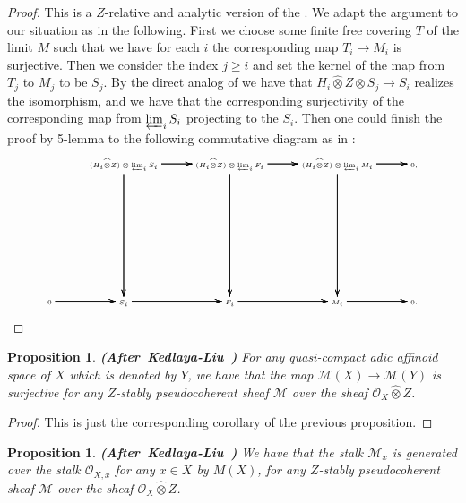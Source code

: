 \documentclass[12pt]{amsart}
\newtheorem{proposition}[theorem]{Proposition}
\theoremstyle{definition}
\numberwithin{equation}{section}
\begin{document}
\begin{proof}
This is a $Z$-relative and analytic version of the \cite[Lemma 2.6.4]{KL2}. We adapt the argument to our situation as in the following. First we choose some finite free covering $T$ of the limit $M$ such that we have for each $i$ the corresponding map $T_i\rightarrow M_i$ is surjective. Then we consider the index $j\geq i$ and set the kernel of the map from $T_j$ to $M_j$ to be $S_j$. By the direct analog of \cite[Lemma 2.5.6]{KL2} we have that $H_i\widehat{\otimes}Z\otimes S_j\overset{}{\rightarrow}S_i$ realizes the isomorphism, and we have that the corresponding surjectivity of the corresponding map from $\varprojlim_i S_i$ projecting to the $S_i$. Then one could finish the proof by 5-lemma to the following commutative diagram as in \cite[Lemma 2.6.4]{KL2}:
\[ \tiny
\xymatrix@C+0pc@R+6pc{
 &(H_i\widehat{\otimes}Z)\otimes \varprojlim_i S_i \ar[r]\ar[r]\ar[r] \ar[d]\ar[d]\ar[d] &(H_i\widehat{\otimes}Z)\otimes \varprojlim_i F_i \ar[r]\ar[r]\ar[r] \ar[d]\ar[d]\ar[d] &(H_i\widehat{\otimes}Z)\otimes \varprojlim_i M_i\ar[r]\ar[r]\ar[r]  \ar[d]\ar[d]\ar[d]&0,\\
0 \ar[r]\ar[r]\ar[r] &S_i   \ar[r]\ar[r]\ar[r] &F_i \ar[r]\ar[r]\ar[r] &M_i \ar[r]\ar[r]\ar[r] &0.\\
}
\]
 
\end{proof}



\begin{proposition}  \mbox{\bf{(After Kedlaya-Liu \cite[Theorem 2.6.5]{KL2})}}
For any quasi-compact adic affinoid space of $X$ which is denoted by $Y$, we have that the map $\mathcal{M}(X)\rightarrow \mathcal{M}(Y)$ is surjective for any $Z$-stably pseudocoherent sheaf $\mathcal{M}$ over the sheaf $\mathcal{O}_X\widehat{\otimes}Z$.	
\end{proposition}


\begin{proof}
This is just the corresponding corollary of the previous proposition.	
\end{proof}











\begin{proposition}  \mbox{\bf{(After Kedlaya-Liu \cite[Theorem 2.6.5]{KL2})}}
We have that the stalk $\mathcal{M}_x$ is generated over the stalk $\mathcal{O}_{X,x}$ for any $x\in X$ by $M(X)$, for any $Z$-stably pseudocoherent sheaf $\mathcal{M}$ over the sheaf $\mathcal{O}_X\widehat{\otimes}Z$.	
\end{proposition}
\end{document}
